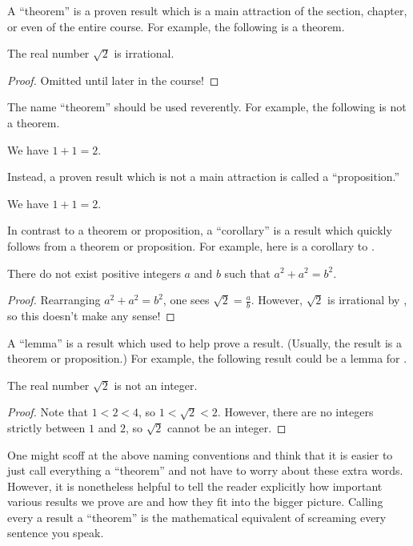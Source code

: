 \documentclass[../notes.tex]{subfiles}
\begin{document}
A ``theorem'' is a proven result which is a main attraction of the section, chapter, or even of the entire course. For example, the following is a theorem.
\begin{theorem}[Wiles] \label{thm:root-2-is-irrational}
    The real number $\sqrt2$ is irrational.
\end{theorem}
\begin{proof}
    Omitted until later in the course!
\end{proof}
The name ``theorem'' should be used reverently. For example, the following is not a theorem.
\begin{theorem}
    We have $1+1=2$.
\end{theorem}
Instead, a proven result which is not a main attraction is called a ``proposition.''
\begin{proposition}
    We have $1+1=2$.
\end{proposition}
In contrast to a theorem or proposition, a ``corollary'' is a result which quickly follows from a theorem or proposition. For example, here is a corollary to .
\begin{corollary}
    There do not exist positive integers $a$ and $b$ such that $a^2+a^2=b^2$.
\end{corollary}
\begin{proof}
    Rearranging $a^2+a^2=b^2$, one sees $\sqrt2=\frac ab$. However, $\sqrt2$ is irrational by , so this doesn't make any sense!
\end{proof}
A ``lemma'' is a result which used to help prove a result. (Usually, the result is a theorem or proposition.) For example, the following result could be a lemma for .
\begin{lemma}
    The real number $\sqrt2$ is not an integer.
\end{lemma}
\begin{proof}
    Note that $1<2<4$, so $1<\sqrt2<2$. However, there are no integers strictly between $1$ and $2$, so $\sqrt2$ cannot be an integer.
\end{proof}
One might scoff at the above naming conventions and think that it is easier to just call everything a ``theorem'' and not have to worry about these extra words. However, it is nonetheless helpful to tell the reader explicitly how important various results we prove are and how they fit into the bigger picture. Calling every a result a ``theorem'' is the mathematical equivalent of screaming every sentence you speak.
\end{document}
